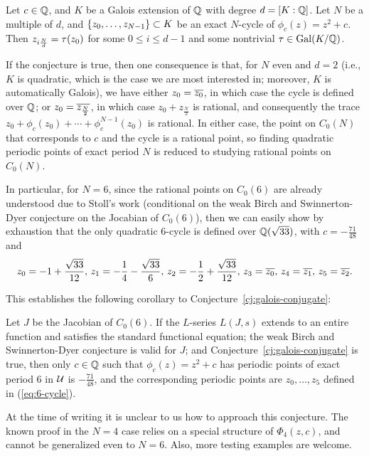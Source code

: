 \begin{conjecture}
  \label{cj:galois-conjugate}
  Let $c \in \mathbb{Q}$, and $K$ be a Galois extension of $\mathbb{Q}$ with degree $d
  = [K : \mathbb{Q}]$. Let $N$ be a multiple of $d$, and $\left\{z_0, \dots,
    z_{N-1}\right\} \subset K$ be an exact $N$-cycle of $\phi_c(z) = z^2 +
  c$. Then $z_{i\frac{N}{d}} = \tau(z_0)$ for some $0 \le i \le d-1$ and some
  nontrivial $\tau \in \mathrm{Gal}(K/\mathbb{Q})$.
\end{conjecture}

If the conjecture is true, then one consequence is that, for $N$ even
and $d = 2$ (i.e., $K$ is quadratic, which is the case we are most
interested in; moreover, $K$ is automatically Galois), we have either
$z_0 = \overline{z_0}$, in which case the cycle is defined over $\mathbb{Q}$; or
$z_0 = \overline{z_{\frac{N}{2}}}$, in which case $z_0 + z_{\frac{N}{2}}$
is rational, and consequently the trace $z_0 + \phi_c(z_0) + \cdots +
\phi_c^{N-1}(z_0)$ is rational. In either case, the point on $C_0(N)$
that corresponds to $c$ and the cycle is a rational point, so finding
quadratic periodic points of exact period $N$ is reduced to studying
rational points on $C_0(N)$.

In particular, for $N = 6$, since the rational points on $C_0(6)$ are
already understood due to Stoll's work \cite{MR2465796} (conditional
on the weak Birch and Swinnerton-Dyer conjecture on the Jocabian of
$C_0(6)$), then we can easily show by exhaustion that the only
quadratic 6-cycle is defined over $\mathbb{Q}(\sqrt{33})$, with $c =
-\frac{71}{48}$ and
\begin{equation}
  \label{eq:6-cycle}
  z_0 = -1 + \frac{\sqrt{33}}{12},\,
  z_1 = -\frac{1}{4} - \frac{\sqrt{33}}{6},\,
  z_2 = -\frac{1}{2} + \frac{\sqrt{33}}{12},\,
  z_3 = \overline{z_0},\,
  z_4 = \overline{z_1},\,
  z_5 = \overline{z_2}.
\end{equation}

This establishes the following corollary to
Conjecture~\ref{cj:galois-conjugate}:

\begin{corollary}
  \label{cor:6-cycle}
  Let $J$ be the Jacobian of $C_0(6)$. If the $L$-series $L(J, s)$
  extends to an entire function and satisfies the standard functional
  equation; the weak Birch and Swinnerton-Dyer conjecture is valid for
  $J$; and Conjecture~\ref{cj:galois-conjugate} is true, then only $c
  \in \mathbb{Q}$ such that $\phi_c(z) = z^2 + c$ has periodic points of exact
  period 6 in $\mathcal{U}$ is $-\frac{71}{48}$, and the corresponding periodic
  points are $z_0, \dots, z_5$ defined in (\ref{eq:6-cycle}).
\end{corollary}

At the time of writing it is unclear to us how to approach this
conjecture. The known proof in the $N = 4$ case relies on a special
structure of $\Phi_4(z, c)$, and cannot be generalized even to $N =
6$. Also, more testing examples are welcome.

